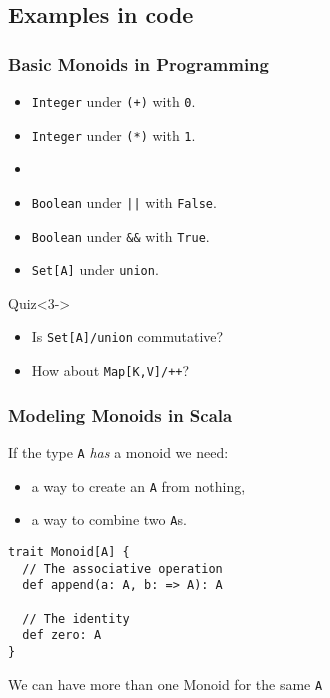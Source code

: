 \documentclass{beamer}
\begin{document}
\subsection{Examples in code}

\begin{frame}\frametitle{Basic Monoids in Programming}
  \begin{itemize}
    \item<1-> \texttt{Integer} under \texttt{(+)} with \texttt{0}.
    \item<1-> \texttt{Integer} under \texttt{(*)} with \texttt{1}.
    \item{}
    \item<3-> \texttt{Boolean} under \texttt{||} with \texttt{False}.
    \item<3-> \texttt{Boolean} under \texttt{\&\&} with \texttt{True}.
    \item<3-> \texttt{Set[A]} under \texttt{union}.
  \end{itemize}

  \begin{block}{Quiz}<3->
    \begin{itemize}
    \item Is \texttt{Set[A]/union} commutative?
    \item How about \texttt{Map[K,V]/++}?
    \end{itemize}
  \end{block}
  \end{frame}

\begin{frame}[fragile]\frametitle{Modeling Monoids in Scala}
  If the type \texttt{A} \emph{has} a monoid we need:
  \begin{itemize}
    \item a way to create an \texttt{A} from nothing,
    \item a way to combine two \texttt{A}s.
  \end{itemize}
  \pause

  \begin{block}{}
  \begin{lstlisting}
trait Monoid[A] {
  // The associative operation
  def append(a: A, b: => A): A

  // The identity
  def zero: A
}
  \end{lstlisting}
  \end{block}
  We can have more than one Monoid for the same \texttt{A}
\end{frame}
\end{document}
